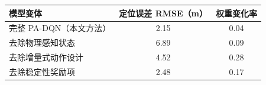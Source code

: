 \begin{table}[htbp]
    \centering
    \label{tab:ablation_padqn}
    \begin{tabular}{@{}lcc@{}}
        \toprule
        \textbf{模型变体} & \textbf{定位误差 RMSE（m）} & \textbf{权重变化率} \\ 
        \midrule
        完整 PA-DQN（本文方法） & 2.15 & 0.04 \\
        去除物理感知状态 & 6.89 & 0.09 \\
        去除增量式动作设计 & 4.52 & 0.28 \\
        去除稳定性奖励项 & 2.48 & 0.17 \\
        \bottomrule
    \end{tabular}
\end{table}